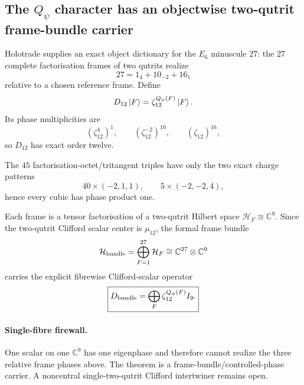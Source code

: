\subsection*{The $Q_\psi$ character has an objectwise two-qutrit frame-bundle carrier}

Holotrade supplies an exact object dictionary for the $E_6$ minuscule $27$:
the $27$ complete factorisation frames of two qutrits realize
\[
27=1_4+10_{-2}+16_1
\]
relative to a chosen reference frame.  Define
\[
D_{12}\left|F\right\rangle=\zeta_{12}^{Q_\psi(F)}\left|F\right\rangle.
\]
Its phase multiplicities are
\[
(\zeta_{12}^{4})^1,\qquad
(\zeta_{12}^{-2})^{10},\qquad
(\zeta_{12})^{16},
\]
so $D_{12}$ has exact order twelve.

The $45$ factorisation-octet/tritangent triples have only the two exact charge
patterns
\[
40\times(-2,1,1),\qquad
5\times(-2,-2,4),
\]
hence every cubic has phase product one.

Each frame is a tensor factorisation of a two-qutrit Hilbert space
$\mathcal H_F\cong\mathbb C^9$.  Since the two-qutrit Clifford scalar center
is $\mu_{12}$, the formal frame bundle
\[
\mathcal H_{\rm bundle}
 =\bigoplus_{F=1}^{27}\mathcal H_F
 \cong\mathbb C^{27}\otimes\mathbb C^9
\]
carries the explicit fibrewise Clifford-scalar operator
\[
\boxed{
D_{\rm bundle}
 =\bigoplus_F \zeta_{12}^{Q_\psi(F)} I_9.
}
\]

\paragraph{Single-fibre firewall.}
One scalar on one $\mathbb C^9$ has one eigenphase and therefore cannot
realize the three relative frame phases above.  The theorem is a
frame-bundle/controlled-phase carrier.  A noncentral single-two-qutrit
Clifford intertwiner remains open.
